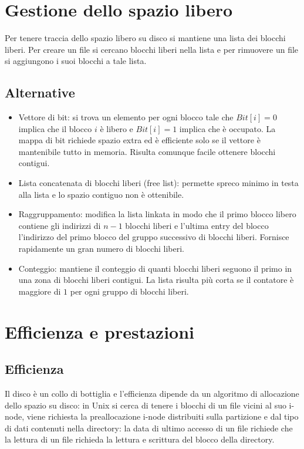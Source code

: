 \section{Gestione dello spazio libero}
Per tenere traccia dello spazio libero su disco si mantiene una lista dei blocchi liberi. Per creare un file si cercano blocchi liberi nella lista e per rimuovere un file si aggiungono
i suoi blocchi a tale lista. 
\subsection{Alternative}
\begin{itemize}
	\item Vettore di bit: si trova un elemento per ogni blocco tale che $Bit[i] = 0$ implica che il blocco $i$ \`e libero e $Bit[i] = 1$ implica che \`e occupato. La mappa di bit
		richiede spazio extra ed \`e efficiente solo se il vettore \`e mantenibile tutto in memoria. Risulta comunque facile ottenere blocchi contigui. 
	\item Lista concatenata di blocchi liberi (free list): permette spreco minimo in testa alla lista e lo spazio contiguo non \`e ottenibile.
	\item Raggruppamento: modifica la lista linkata in modo che il primo blocco libero contiene gli indirizzi di $n-1$ blocchi liberi e l'ultima entry del blocco l'indirizzo del
		primo blocco del gruppo successivo di blocchi liberi. Fornisce rapidamente un gran numero di blocchi liberi. 
	\item Conteggio: mantiene il conteggio di quanti blocchi liberi seguono il primo in una zona di blocchi liberi contigui. La lista risulta pi\`u corta se il contatore \`e maggiore
		di $1$ per ogni gruppo di blocchi liberi. 
\end{itemize}
\section{Efficienza e prestazioni}
\subsection{Efficienza}
Il disco \`e un collo di bottiglia e l'efficienza dipende da un algoritmo di allocazione dello spazio su disco: in Unix si cerca di tenere i blocchi di un file vicini al suo i-node, 
viene richiesta la preallocazione i-node distribuiti sulla partizione e dal tipo di dati contenuti nella directory: la data di ultimo accesso di un file richiede che la lettura di un
file richieda la lettura e scrittura del blocco della directory. 
